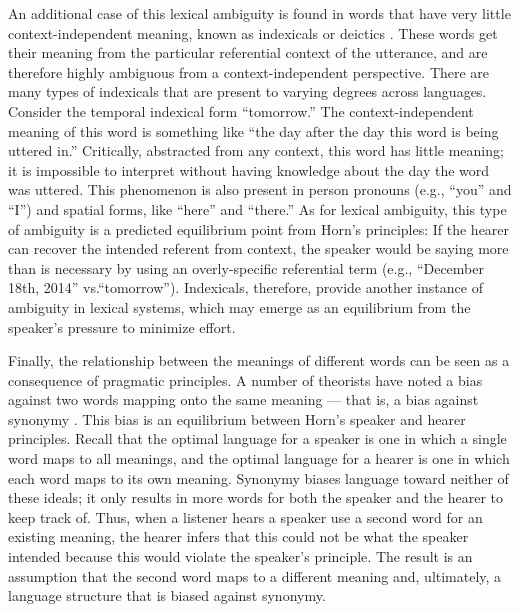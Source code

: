 An additional case of this lexical ambiguity is found in words that have very little context-independent meaning, known as indexicals or deictics \cite{frawley2003international}. These words get their meaning from the particular referential context of the utterance, and are therefore highly ambiguous from a context-independent perspective. There are many types of indexicals that are present to varying degrees across languages. Consider the temporal indexical form ``tomorrow.'' The context-independent meaning of this word is something like ``the day after the day this word is being uttered in.'' Critically, abstracted from any context, this word has little meaning; it is impossible to interpret without having knowledge about the day the word was uttered. This phenomenon is also present in person pronouns (e.g., ``you'' and ``I'') and spatial forms, like ``here'' and ``there.'' As for lexical ambiguity, this type of ambiguity is a predicted equilibrium point from Horn's principles: If the hearer can recover the intended referent from context, the speaker would be saying more than is necessary by using an overly-specific referential term (e.g., ``December 18th, 2014'' vs.``tomorrow''). Indexicals, therefore, provide another instance of ambiguity in lexical systems, which may emerge as an equilibrium from the speaker's pressure to minimize effort. 

Finally, the relationship between the meanings of different words can be seen as a consequence of pragmatic principles. A number of theorists have noted a bias against two words mapping onto the same meaning --- that is, a bias against synonymy \cite{saussure,kiparsky1983word,horn1984,clark1987principle,clark1988logic}. This bias is an equilibrium between Horn's speaker and hearer principles. Recall that the optimal language for a speaker is one in which a single word maps to all meanings, and the optimal language for a hearer is one in which each word maps to its own meaning. Synonymy biases language toward neither of these ideals; it only results in more words for both the speaker and the hearer to keep track of.  Thus, when a listener hears a speaker use a second word for an existing meaning, the hearer infers that this could not be what the speaker intended because this would violate the speaker's principle. The result is  an assumption that the second word maps to a different meaning and, ultimately, a language structure that is biased against synonymy.

